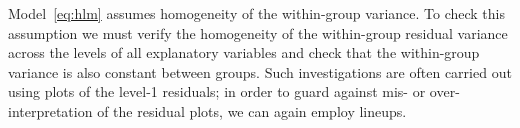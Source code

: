 \documentclass[12pt]{article} %
\newcommand{\hh}[1]{{\color{orange} #1}}
\newcommand{\alnote}[1]{\todo[inline,color=green!40]{#1}} %
\newcommand{\hhnote}[1]{\todo[inline,color=orange!40]{#1}}
\begin{document}







Model~\eqref{eq:hlm} assumes homogeneity of the within-group variance. To check this assumption we must verify the homogeneity of the within-group residual variance across the levels of all explanatory variables and check that the within-group variance is also constant between groups. Such investigations are often carried out using plots of the level-1 residuals; in order to guard against mis- or over-interpretation of the residual plots, we can again employ lineups.
\end{document}
